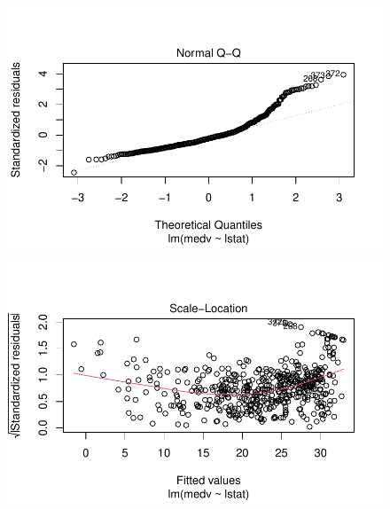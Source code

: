 \documentclass[
  letterpaper,
  DIV=11,
  numbers=noendperiod]{scrartcl}
\begin{document}
\begin{figure}[H]

{\centering \includegraphics{Resumen-2---3_files/figure-pdf/unnamed-chunk-10-2.pdf}

}

\end{figure}

\begin{figure}[H]

{\centering \includegraphics{Resumen-2---3_files/figure-pdf/unnamed-chunk-10-3.pdf}

}

\end{figure}
\end{document}
